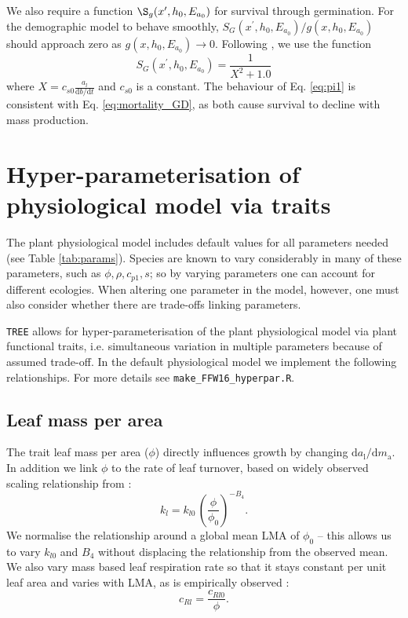 \documentclass[10pt,twoside]{article}
\begin{document}
We also require a function \(\S_g(x^\prime,h_0, E_{a_0})\) for survival
through germination. For the demographic model to behave smoothly, 
\(S_G (x^\prime,h_0, E_{a_0}) / g(x,h_0, E_{a_0})\) should approach zero as
\(g(x,h_0, E_{a_0}) \rightarrow 0\). Following \citep{Falster-2011},
we use the function
\begin{equation} \label{eq:pi1}
  S_G (x^\prime,h_0, E_{a_0}) = \frac1{X^2 + 1.0}
\end{equation}
where $X = c_{s0} \frac{a_l}{\textrm{d}b / \textrm{d}t}$ and $c_{s0}$ is a
constant. The behaviour of Eq. \ref{eq:pi1} is consistent with Eq. 
\ref{eq:mortality_GD}, as both cause survival to decline with mass production.

\section{Hyper-parameterisation of physiological model via
traits}\label{traits}

The plant physiological model includes default values for all parameters needed 
(see Table \ref{tab:params}). Species are known to vary considerably
in many of these parameters, such as $\phi,\rho,c_{p1},s$; so by varying  parameters
one can account for different ecologies. When altering one parameter in the model, however,
one must also consider whether there are trade-offs linking parameters. 

\texttt{TREE} allows for 
hyper-parameterisation of the plant physiological model via plant functional traits, i.e. 
simultaneous variation in multiple parameters because of assumed trade-off. In the 
default physiological model we implement the following relationships. For more 
details see \texttt{make\_FFW16\_hyperpar.R}.

\subsection{Leaf mass per area}

The trait leaf mass per area ($\phi$) directly influences growth by changing 
$\textrm{d}a_\textrm{l} / \textrm{d}m_\textrm{a}$. In addition we  
link $\phi$ to the rate of leaf turnover,
based on widely observed scaling relationship from \citet{Wright-2004}:
$$k_l=k_{l0} \, \left(\frac{\phi}{\phi_0}\right)^{-B_4}.$$
We normalise the relationship around a global mean LMA of $\phi_0$ -- this
allows us to vary $k_{l0}$ and $B_4$ without displacing the relationship from the 
observed mean. 
We also vary mass based leaf respiration rate so that it stays constant per unit leaf area and
varies with LMA, as is empirically observed \citet{Wright-2004}:
$$c_{Rl}= \frac{c_{Rl0}}{\phi}.$$
\end{document}
